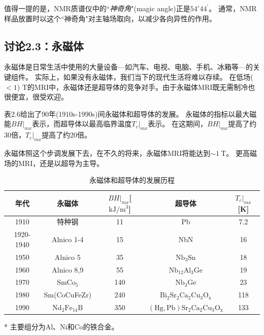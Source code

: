 值得一提的是，NMR质谱仪中的``\textit{神奇角}"(magic angle)正是$54^\circ 44^\prime$。
通常，NMR样品放置时以这个``神奇角"对主轴场取向，以减少各向异性的作用。


\subsection{讨论2.3：永磁体}
永磁体是日常生活中使用的大量设备---如汽车、电视、电脑、手机、冰箱等---的关键组件。
实际上，如果没有永磁体，我们当下的现代生活将难以存续。
在低场($<1$) T的MRI中，永磁体还是超导体的竞争对手。由于永磁体MRI既无需制冷也很便宜，很受欢迎。

表2.6给出了90年(1910s-1990s)间永磁体和超导体的发展。
永磁体的指标以最大磁能$BH|_{mx}$表示，而超导体以最高临界温度$T_c|_{mx}$表示。
在这期间，$BH|_{mx}$提高了约30倍，$T_c|_{mx}$提高了约20倍。

永磁体照这个步调发展下去，在不久的将来，永磁体MRI将能达到$\sim 1\ $T。
更高磁场的MRI，还是以超导为主导。

\begin{table}[htbp]
\centering
\caption{永磁体和超导体的发展历程}
\label{磁体和超导体的发展}
\begin{threeparttable}
\begin{tabular}{|c|c|c||c|c|}
\hline
年代        & 永磁体 & $BH|_{mx}$[$\mathrm{kJ/m^3}$] & 超导体 & $T_c|_{mx}$[K]   \\ \hline
1910      &  特种钢   & 11       &  Pb   & 7.2 \\ \hline
1920-1940 &  Alnico\tnote{*} 1-4   & 15       &   NbN  & 16  \\ \hline
1950      &   Alnico 5  & 35       &    $\mathrm{Nb_3 Sn}$ & 18  \\ \hline
1960      &   Alnico 8,9  & 55       &   $\mathrm{Nb_{12}Al_3 Ge}$  &   19  \\ \hline
1970      &   $\mathrm{SmCo_5} $  & 140      &  $\mathrm{Nb_3Ge}$   & 23    \\ \hline
1980      &   Sm(CoCuFeZr)  & 240      &  $\mathrm{Bi_2 Sr_2 Ca_2 Cu_3 O_x}$   & 118 \\ \hline
1990      &  $\mathrm{Nd_2Fe_{14}B}$   & 350      & $\mathrm{(Hg, Pb) Sr_2 Ca_2 Cu_3 O_x}$    & 133 \\ \hline
\end{tabular}
\begin{tablenotes}
        \footnotesize
        \item[*] 主要组分为Al、Ni和Co的铁合金。 %
      \end{tablenotes}
\end{threeparttable}
\end{table}



